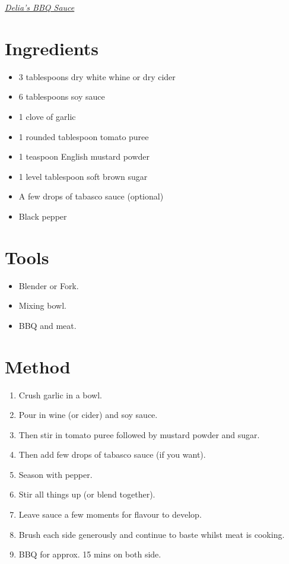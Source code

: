 \documentclass[a4paper,11pt, onecolumn]{article}
\begin{document}
   \centerline{\underline{\emph{\huge Delia's BBQ Sauce}}}
   \vspace{1cm}

\begin{multicols}{2}



\section*{Ingredients}

\begin{itemize}
\item 3 tablespoons dry white whine or dry cider
\item 6 tablespoons soy sauce
\item 1 clove of garlic
\item 1 rounded tablespoon tomato puree
\item 1 teaspoon English mustard powder
\item 1 level tablespoon soft brown sugar
\item A few drops of tabasco sauce (optional)
\item Black pepper
\end{itemize}

\columnbreak

\section*{Tools}
\begin{itemize}
\item Blender or Fork.
\item Mixing bowl.
\item BBQ and meat.
\end{itemize}

\end{multicols}
\hrulefill
\section*{Method}

\begin{enumerate}
\item Crush garlic in a bowl.
\item Pour in wine (or cider) and soy sauce.
\item Then stir in tomato puree followed by mustard powder and sugar.
\item Then add few drops of tabasco sauce (if you want).
\item Season with pepper.
\item Stir all things up (or blend together).
\item Leave sauce a few moments for flavour to develop.
\item Brush each side generously and continue to baste whilst meat is cooking.
\item BBQ for approx. 15 mins on both side.
\end{enumerate}
 
\end{document}
